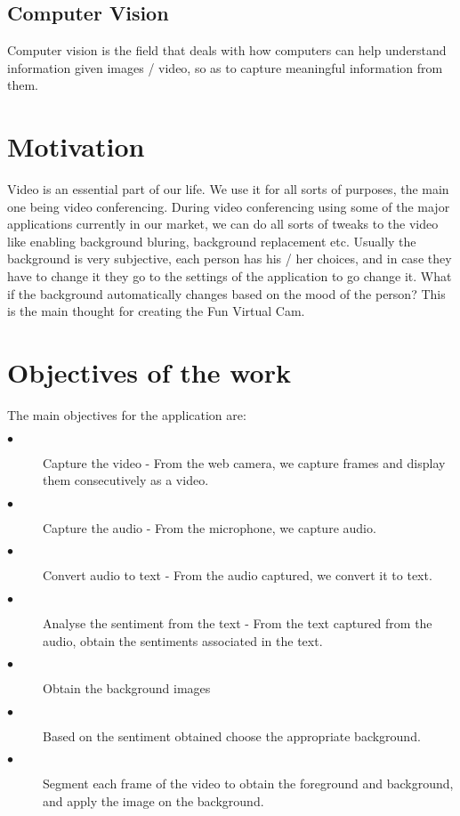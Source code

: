 \subsection{Computer Vision}
Computer vision is the field that deals with how computers can help understand information given images / video, so as to capture meaningful information from them.


\section{Motivation}
Video is an essential part of our life. We use it for all sorts of purposes, the main one being video conferencing. During video conferencing using some of the major applications currently in our market, we can do all sorts of tweaks to the video like enabling background bluring, background replacement etc. Usually the background is very subjective, each person has his / her choices, and in case they have to change it they go to the settings of the application to go change it. What if the background automatically changes based on the mood of the person? This is the main thought for creating the Fun Virtual Cam.

\section{Objectives of the work}
The main objectives for the application are:
\begin{description}
\item[$\bullet$] Capture the video - From the web camera, we capture frames and display them consecutively as a video.

\item[$\bullet$] Capture the audio - From the microphone, we capture audio.

\item[$\bullet$] Convert audio to text - From the audio captured, we convert it to text.

\item[$\bullet$] Analyse the sentiment from the text - From the text captured from the audio, obtain the sentiments associated in the text.

\item[$\bullet$] Obtain the background images

\item[$\bullet$] Based on the sentiment obtained choose the appropriate background.

\item[$\bullet$] Segment each frame of the video to obtain the foreground and background, and apply the image on the background.

\end{description}
